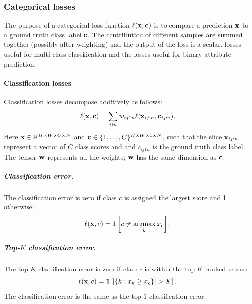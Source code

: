 \subsubsection{Categorical losses}\label{s:catlosses}

The purpose of a categorical loss function $\ell(\mathbf{x},\mathbf{c})$ is to compare a prediction $\mathbf{x}$ to a ground truth class label $\mathbf{c}$. The contribution of different samples are summed together (possibly after weighting) and the output of the loss is a scalar.  losses useful for multi-class classification and the  losses useful for binary attribute prediction. 

\paragraph{Classification losses}\label{s:loss-classification}

Classification losses decompose additively as follows:
\begin{equation}\label{e:addloss}
\ell(\mathbf{x},\mathbf{c}) = \sum_{ijn} w_{ij1n} \ell(\mathbf{x}_{ij:n}, \mathbf{c}_{ij:n}).
\end{equation}
Here $\mathbf{x} \in \mathbb{R}^{H \times W \times C \times N}$ and $\mathbf{c} \in \{1, \dots, C\}^{H \times W \times 1 \times N}$, such that the slice $\mathbf{x}_{ij:n}$ represent a vector of $C$ class scores and and $c_{ij1n}$ is the ground truth class label. The tensor $\mathbf{w}$ represents all the weights; $\mathbf{w}$ has the same dimension as $\mathbf{c}$.

\subparagraph{Classification error.} The classification error is zero if class $c$ is assigned the largest score and 1 otherwise:
\begin{equation}\label{e:loss-classerror}
\ell(\bx,c) = \mathbf{1}\left[c \not= \argmax_k x_c\right].
\end{equation}

\subparagraph{Top-$K$ classification error.} The top-$K$ classification error is zero if class $c$ is within the top $K$ ranked scores:
\begin{equation}\label{e:loss-classerrorTopK}
\ell(\mathbf{x},c) = \mathbf{1}\left[ |\{k : x_k \geq x_c \}| > K \right].
\end{equation}
The classification error is the same as the top-$1$ classification error.

